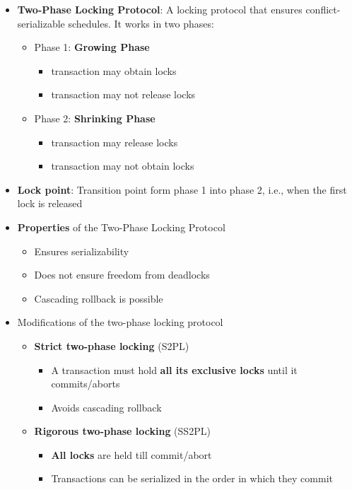 \begin{itemize}[label=\(\rhd\)]
    \item \textbf{Two-Phase Locking Protocol}: A locking protocol that ensures conflict-serializable schedules. It works in two phases:
    \begin{itemize}[label=\(\rhd\)]
        \item Phase 1: \textbf{Growing Phase}
        \begin{itemize}[label=\(\rhd\)]
            \item transaction may obtain locks
            \item transaction may not release locks
        \end{itemize}
        \item Phase 2: \textbf{Shrinking Phase}
        \begin{itemize}[label=\(\rhd\)]
            \item transaction may release locks 
            \item transaction may not obtain locks
        \end{itemize}
    \end{itemize}
    \item \textbf{Lock point}: Transition point form phase 1 into phase 2, i.e., when the first lock is released
    \item \textbf{Properties} of the Two-Phase Locking Protocol
    \begin{itemize}[label=\(\rhd\)]
    \item Ensures serializability
    \item Does not ensure freedom from deadlocks
    \item Cascading rollback is possible
\end{itemize}
\item Modifications of the two-phase locking protocol
\begin{itemize}[label=\(\rhd\)]
    \item \textbf{Strict two-phase locking} (S2PL)
    \begin{itemize}[label=\(\rhd\)]
    \item A transaction must hold \textbf{all its exclusive locks} until it commits/aborts
    \item Avoids cascading rollback
\end{itemize}
\item \textbf{Rigorous two-phase locking} (SS2PL)
\begin{itemize}[label=\(\rhd\)]
    \item \textbf{All locks} are held till commit/abort
    \item Transactions can be serialized in the order in which they commit
\end{itemize}
\end{itemize}
\end{itemize}

